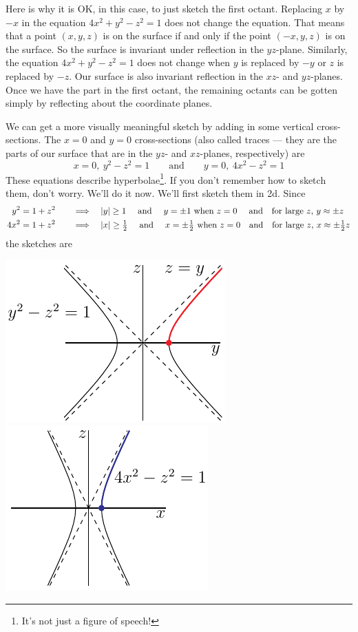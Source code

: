 \begin{eg}[$4x^2+y^2-z^2=1$]
Here is why it is OK, in this case, to just sketch the first octant.
Replacing $x$ by $-x$ in the equation $4x^2+y^2-z^2=1$
does not change the equation. That means that a point $(x,y,z)$ is on the
surface if and only if the point $(-x,y,z)$ is on the surface. So the surface
is invariant under reflection in the $yz$-plane. Similarly, the equation
$4x^2+y^2-z^2=1$ does not change when $y$ is replaced by $-y$ or $z$ is
replaced by $-z$. Our surface is also invariant reflection in the $xz$-
and $yz$-planes. Once we have the part in the first octant, the remaining 
octants can be gotten simply by reflecting about the coordinate planes.

We can get a more visually meaningful sketch by adding in some vertical
cross-sections. The $x=0$ and $y=0$ cross-sections (also called traces
--- they are the parts of our surface that are in the $yz$- and $xz$-planes,
respectively)
are
\begin{equation*}
x=0,\ y^2-z^2=1\qquad\text{and}\qquad
y=0,\ 4x^2-z^2=1
\end{equation*}
These equations describe hyperbolae\footnote{It's not just a figure of speech!}. If you don't remember how to sketch them, don't worry. We'll
do it now. We'll first sketch them in 2d. Since
\begin{alignat*}{3}
y^2&=1+z^2 &\quad\implies\quad
   &|y|\ge 1\quad\text{ and }\quad 
    y=\pm 1\text{ when }z=0\quad
    \text{ and\quad for large $z$, }y\approx\pm z \\
4x^2&=1+z^2 & \quad\implies\quad
   &|x|\ge \tfrac{1}{2}\quad\text{ and }\quad 
   x=\pm\tfrac{1}{2}\text{ when }z=0\quad 
   \text{and\quad for large $z$, }x\approx\pm \tfrac{1}{2}z
\end{alignat*}
the sketches are
\begin{efig}
\begin{center}
   \includegraphics{hyperbolaXa.pdf}\qquad
   \includegraphics{hyperbolaYa.pdf}

\end{center}
\end{efig}
\end{eg}
